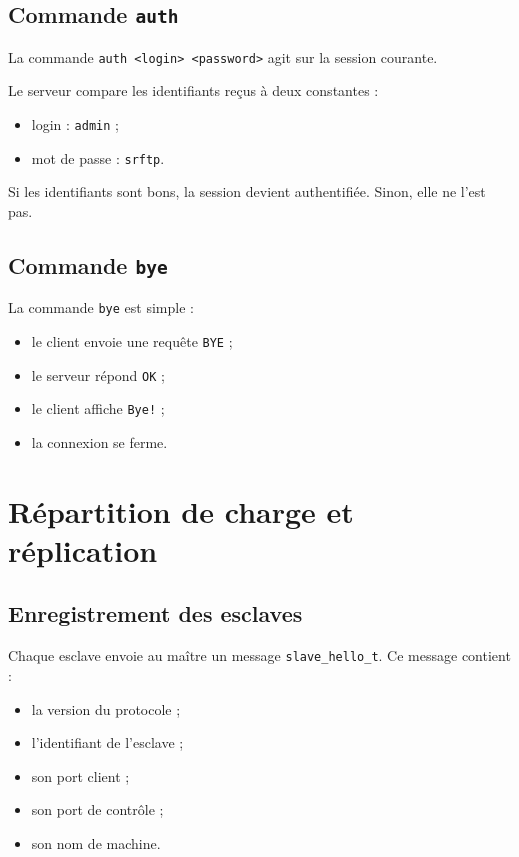 \documentclass[a4paper,11pt]{article}
\begin{document}
\subsection{Commande \texttt{auth}}

La commande \texttt{auth <login> <password>} agit sur la session courante.

Le serveur compare les identifiants reçus à deux constantes :

\begin{itemize}[leftmargin=*]
    \item login : \texttt{admin} ;
    \item mot de passe : \texttt{srftp}.
\end{itemize}

Si les identifiants sont bons, la session devient authentifiée. Sinon, elle ne
l'est pas.

\subsection{Commande \texttt{bye}}

La commande \texttt{bye} est simple :

\begin{itemize}[leftmargin=*]
    \item le client envoie une requête \texttt{BYE} ;
    \item le serveur répond \texttt{OK} ;
    \item le client affiche \texttt{Bye!} ;
    \item la connexion se ferme.
\end{itemize}
\newpage
\section{Répartition de charge et réplication}

\subsection{Enregistrement des esclaves}

Chaque esclave envoie au maître un message \texttt{slave\_hello\_t}. Ce message
contient :

\begin{itemize}[leftmargin=*]
    \item la version du protocole ;
    \item l'identifiant de l'esclave ;
    \item son port client ;
    \item son port de contrôle ;
    \item son nom de machine.
\end{itemize}
\end{document}
